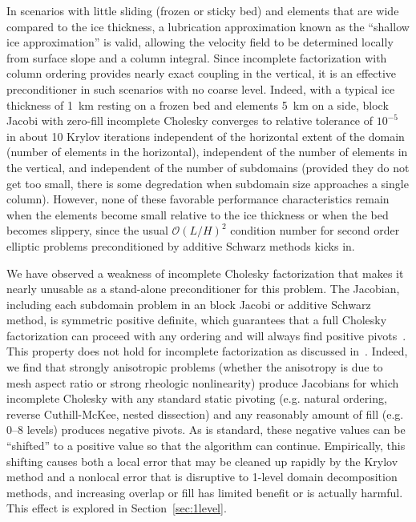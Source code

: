 \documentclass[3p]{elsarticle}
\newcommand{\bigO}{{\mathcal{O}}}
\begin{document}
In scenarios with little sliding (frozen or sticky bed) and elements that are wide compared to the
ice thickness, a lubrication approximation known as the ``shallow ice approximation'' is valid,
allowing the velocity field to be determined locally from surface slope and a column integral.
Since incomplete factorization with column ordering provides nearly exact coupling in the vertical,
it is an effective preconditioner in such scenarios with no coarse level.  Indeed, with a typical
ice thickness of \SI{1}{\kilo\metre} resting on a frozen bed and elements \SI{5}{\kilo\metre} on
a side, block Jacobi with zero-fill incomplete Cholesky converges to relative tolerance of $10^{-5}$
in about 10 Krylov iterations independent of the horizontal extent of the domain (number of elements
in the horizontal), independent of the number of elements in the vertical, and independent of the
number of subdomains (provided they do not get too small, there is some degredation when subdomain
size approaches a single column).  However, none of these favorable performance characteristics
remain when the elements become small relative to the ice thickness or when the bed becomes
slippery, since the usual $\bigO{(L/H)^2}$ condition number for second order elliptic problems
preconditioned by additive Schwarz methods kicks in.

We have observed a weakness of incomplete Cholesky factorization that makes it nearly unusable as a
stand-alone preconditioner for this problem.  The Jacobian, including each subdomain problem in an
block Jacobi or additive Schwarz method, is symmetric positive definite, which guarantees that a
full Cholesky factorization can proceed with any ordering and will always find positive
pivots~\cite{trefethen1997numerical}.  This property does not hold for incomplete factorization as
discussed in~\cite{kershaw1978incomplete}.  Indeed, we find that strongly anisotropic problems
(whether the anisotropy is due to mesh aspect ratio or strong rheologic nonlinearity) produce
Jacobians for which incomplete Cholesky with any standard static pivoting (e.g. natural ordering,
reverse Cuthill-McKee, nested dissection) and any reasonably amount of fill (e.g. 0--8 levels)
produces negative pivots.  As is standard, these negative values can be ``shifted'' to a positive
value so that the algorithm can continue.  Empirically, this shifting causes both a local error that
may be cleaned up rapidly by the Krylov method and a nonlocal error that is disruptive to 1-level
domain decomposition methods, and increasing overlap or fill has limited benefit or is actually
harmful.  This effect is explored in Section~\ref{sec:1level}.
\end{document}
